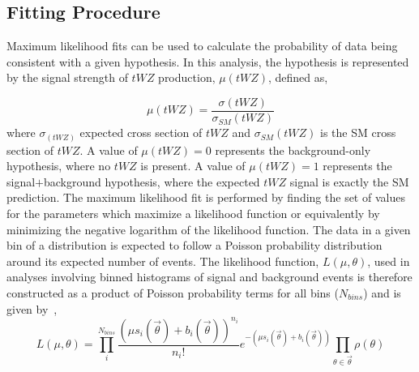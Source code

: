 \subsection{Fitting Procedure}
\label{sec:fitting-procedure}
Maximum likelihood fits can be used to calculate the probability of data being consistent with a given hypothesis. In this analysis, the hypothesis is represented by the signal strength of $tWZ$ production, $\mu (tWZ)$, defined as,

\begin{equation}
\mu (tWZ) = \frac{\sigma(tWZ)}{\sigma_{SM}(tWZ)}
\end{equation}
where $\sigma_(tWZ)$ expected cross section of $tWZ$ and $\sigma_{SM}(tWZ)$ is the SM cross section of $tWZ$. A value of $\mu (tWZ) = 0$ represents the background-only hypothesis, where no $tWZ$ is present. A value of $\mu (tWZ) = 1$ represents the signal$+$background hypothesis, where the expected $tWZ$ signal is exactly the SM prediction. The maximum likelihood fit is performed by finding the set of values for the parameters which maximize a likelihood function or equivalently by minimizing the negative logarithm of the likelihood function. The data in a given bin of a distribution is expected to follow a Poisson probability distribution around its expected number of events. The likelihood function, $L(\mu,\theta)$, used in analyses involving binned histograms of signal and background events is therefore constructed as a product of Poisson probability terms for all bins ($N_{bins}$) and is given by~\cite{BARLOW1993219},
\begin{equation}
L(\mu, \theta) = \prod_{i}^{N_{bins}} \frac{(\mu s_{i}(\vec{\theta}) + b_{i} (\vec{\theta}))^{n_{i}}}{n_{i}!} e^{-(\mu s_{i}(\vec{\theta}) + b_{i} (\vec{\theta}))} \prod_{\theta \in \vec{\theta}} \rho (\theta) 
\end{equation}
